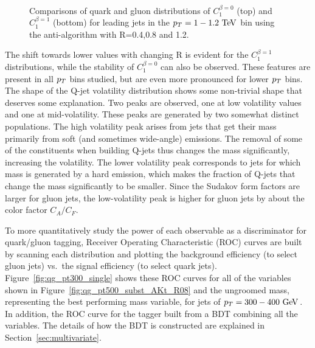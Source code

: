 \begin{figure}
\begin{center}
\\
\caption{Comparisons of quark and gluon distributions of $C_1^{\beta=0}$ (top) and $C_1^{\beta=1}$ (bottom) 
for leading jets in the $\pt=1-1.2 \TeV$ bin using the anti-\kT algorithm with R=0.4,0.8 and 1.2. }
\label{fig:Rdep_qg_C_pt1000}
\end{center}
\end{figure}
The shift towards lower values with changing R is evident for the $C_1^{\beta=1}$ distributions, while the stability
of $C_1^{\beta=0}$ can also be observed. These features are present in all $p_T$ bins studied, but are even more
pronounced for lower $p_T$ bins. The shape of the Q-jet volatility distribution shows some non-trivial shape that
deserves some explanation. Two peaks are observed, one at low volatility values and one at mid-volatility. These
peaks are generated by two somewhat distinct populations. The high volatility peak arises from jets that get their
mass primarily from soft (and sometimes wide-angle) emissions. The removal of some of the constituents when
building Q-jets thus changes the mass significantly, increasing the volatility. The lower volatility peak corresponds
to jets for which mass is generated by a hard emission, which makes the fraction of Q-jets that change 
the mass significantly to be smaller. Since the Sudakov form factors are larger for gluon jets, the low-volatility 
peak is higher for gluon jets by about the color factor $C_A/C_F$. 

To more quantitatively study the power of each observable as a
discriminator for quark/gluon tagging, Receiver Operating Characteristic (ROC) curves are built by scanning each distribution
and plotting the background efficiency (to select gluon jets) vs.~the signal efficiency (to select quark jets). 
Figure~\ref{fig:qg_pt300_single} shows these ROC curves for all of the variables shown in 
Figure~\ref{fig:qg_pt500_subst_AKt_R08} and the ungroomed mass, representing the 
best performing mass variable, for jets of $\pt=300-400\GeV$. In addition, the ROC curve for 
the tagger built from a BDT combining all the variables. The details of how the BDT is constructed 
are explained in Section~\ref{sec:multivariate}. 

